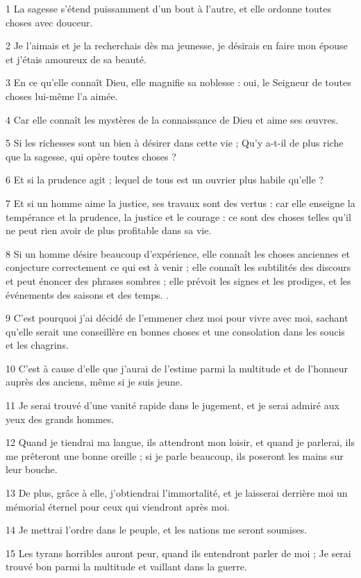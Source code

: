 \par 1 La sagesse s'étend puissamment d'un bout à l'autre, et elle ordonne toutes choses avec douceur.
\par 2 Je l'aimais et je la recherchais dès ma jeunesse, je désirais en faire mon épouse et j'étais amoureux de sa beauté.
\par 3 En ce qu'elle connaît Dieu, elle magnifie sa noblesse : oui, le Seigneur de toutes choses lui-même l'a aimée.
\par 4 Car elle connaît les mystères de la connaissance de Dieu et aime ses œuvres.
\par 5 Si les richesses sont un bien à désirer dans cette vie ; Qu'y a-t-il de plus riche que la sagesse, qui opère toutes choses ?
\par 6 Et si la prudence agit ; lequel de tous est un ouvrier plus habile qu’elle ?
\par 7 Et si un homme aime la justice, ses travaux sont des vertus : car elle enseigne la tempérance et la prudence, la justice et le courage : ce sont des choses telles qu'il ne peut rien avoir de plus profitable dans sa vie.
\par 8 Si un homme désire beaucoup d'expérience, elle connaît les choses anciennes et conjecture correctement ce qui est à venir ; elle connaît les subtilités des discours et peut énoncer des phrases sombres ; elle prévoit les signes et les prodiges, et les événements des saisons et des temps. .
\par 9 C'est pourquoi j'ai décidé de l'emmener chez moi pour vivre avec moi, sachant qu'elle serait une conseillère en bonnes choses et une consolation dans les soucis et les chagrins.
\par 10 C'est à cause d'elle que j'aurai de l'estime parmi la multitude et de l'honneur auprès des anciens, même si je suis jeune.
\par 11 Je serai trouvé d'une vanité rapide dans le jugement, et je serai admiré aux yeux des grands hommes.
\par 12 Quand je tiendrai ma langue, ils attendront mon loisir, et quand je parlerai, ils me prêteront une bonne oreille ; si je parle beaucoup, ils poseront les mains sur leur bouche.
\par 13 De plus, grâce à elle, j'obtiendrai l'immortalité, et je laisserai derrière moi un mémorial éternel pour ceux qui viendront après moi.
\par 14 Je mettrai l'ordre dans le peuple, et les nations me seront soumises.
\par 15 Les tyrans horribles auront peur, quand ils entendront parler de moi ; Je serai trouvé bon parmi la multitude et vaillant dans la guerre.
